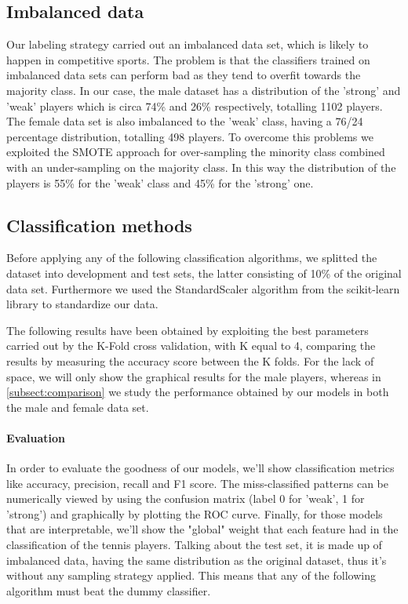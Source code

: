 \subsection{Imbalanced data}
Our labeling strategy carried out an imbalanced data set, which is likely to happen in competitive sports. The problem is that the classifiers trained on imbalanced data sets can perform bad as they tend to overfit towards the majority class. In our case, the male dataset has a distribution of the 'strong' and 'weak' players which is circa 74\% and 26\% respectively, totalling 1102 players. The female data set is also imbalanced to the 'weak' class, having a 76/24 percentage distribution, totalling 498 players. To overcome this problems we exploited the SMOTE approach for over-sampling the minority class combined with an under-sampling on the majority class. In this way the distribution of the players is 55\% for the 'weak' class and 45\% for the 'strong' one.

\subsection{Classification methods}
Before applying any of the following classification algorithms, we splitted the dataset into development and test sets, the latter consisting of 10\% of the original data set. Furthermore we used the StandardScaler algorithm from the scikit-learn library to standardize our data.

The following results have been obtained by exploiting the best parameters carried out by the K-Fold cross validation, with K equal to 4, comparing the results by measuring the accuracy score between the K folds. For the lack of space, we will only show the graphical results for the male players, whereas in \autoref{subsect:comparison} we study the performance obtained by our models in both the male and female data set.

\paragraph{Evaluation} In order to evaluate the goodness of our models, we'll show classification metrics like accuracy, precision, recall and F1 score. The miss-classified patterns can be numerically viewed by using the confusion matrix (label 0 for 'weak', 1 for 'strong') and graphically by plotting the ROC curve. Finally, for those models that are interpretable, we'll show the "global" weight that each feature had in the classification of the tennis players. Talking about the test set, it is made up of imbalanced data, having the same distribution as the original dataset, thus it's without any sampling strategy applied. This means that any of the following algorithm must beat the dummy classifier.


